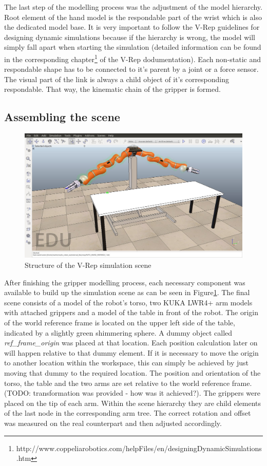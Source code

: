 The last step of the modelling process was the adjustment of the model hierarchy. Root element of the hand model is the respondable part of the wrist which is also the dedicated model base. It is very important to follow the V-Rep guidelines for designing dynamic simulations because if the hierarchy is wrong, the model will simply fall apart when starting the simulation (detailed information can be found in the corresponding chapter\footnote{http://www.coppeliarobotics.com/helpFiles/en/designingDynamicSimulations.htm} of the V-Rep dodumentation). Each non-static and respondable shape has to be connected to it's parent by a joint or a force sensor. The visual part of the link is always a child object of it's corresponding respondable. That way, the kinematic chain of the gripper is formed.

\subsection{Assembling the scene}

\begin{figure}[ht]
	\centering
  	\includegraphics[width=1.0\textwidth]{images/simulation_scene.jpg}
	\caption{Structure of the V-Rep simulation scene}
	\label{fig:sim_scene}
\end{figure}

After finishing the gripper modelling process, each necessary component was available to build up the simulation scene as can be seen in Figure\ref{fig:sim_scene}. The final scene consists of a model of the robot's torso, two KUKA LWR4+ arm models with attached grippers and a model of the table in front of the robot. The origin of the world reference frame is located on the upper left side of the table, indicated by a slightly green shimmering sphere. A dummy object called \emph{ref\_frame\_origin} was placed at that location. Each position calculation later on will happen relative to that dummy element. If it is necessary to move the origin to another location within the workspace, this can simply be achieved by just moving that dummy to the required location. The position and orientation of the torso, the table and the two arms are set relative to the world reference frame. (TODO: transformation was provided - how was it achieved?). The grippers were placed on the tip of each arm. Within the scene hierarchy they are child elements of the last node in the corresponding arm tree. The correct rotation and offset was measured on the real counterpart and then adjusted accordingly. \\

